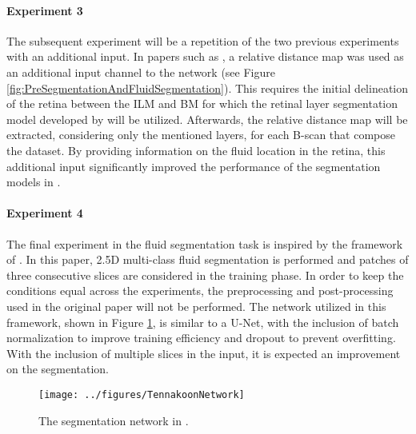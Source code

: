 \paragraph{Experiment 3}
The subsequent experiment will be a repetition of the two previous experiments with an additional input. In papers such as \parencite{Tang2022, Lu2019, Rahil2023}, a relative distance map was used as an additional input channel to the network (see Figure \ref{fig:PreSegmentationAndFluidSegmentation}). This requires the initial delineation of the retina between the ILM and BM for which the retinal layer segmentation model developed by \textcite{Melo2023} will be utilized. Afterwards, the relative distance map will be extracted, considering only the mentioned layers, for each B-scan that compose the dataset. By providing information on the fluid location in the retina, this additional input significantly improved the performance of the segmentation models in \parencite{Tang2022, Lu2019, Rahil2023}.

\paragraph{Experiment 4}\label{Experiment4}
The final experiment in the fluid segmentation task is inspired by the framework of \textcite{Tennakoon2018}. In this paper, 2.5D multi-class fluid segmentation is performed and patches of three consecutive slices are considered in the training phase. In order to keep the conditions equal across the experiments, the preprocessing and post-processing used in the original paper will not be performed. The network utilized in this framework, shown in Figure \ref{fig:TennakoonNetwork}, is similar to a U-Net, with the inclusion of batch normalization to improve training efficiency and dropout to prevent overfitting. With the inclusion of multiple slices in the input, it is expected an improvement on the segmentation.

\begin{figure}[!ht]
	\centering
	\texttt{[image: ../figures/TennakoonNetwork]}
	\caption{The segmentation network in \cite{Tennakoon2018}.}
	\label{fig:TennakoonNetwork}
\end{figure}

